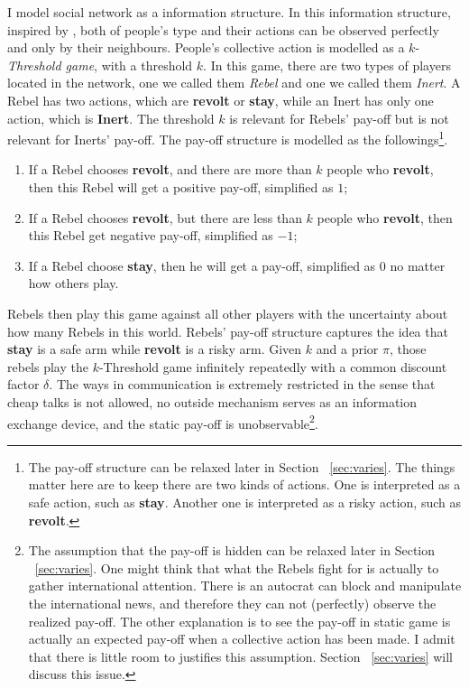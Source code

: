 \documentclass[12pt,letter]{article}
\theoremstyle{definition}
\theoremstyle{remark}
\theoremstyle{claim}
\begin{document}
I model social network as a information structure. In this information structure, inspired by \citep{chwe2000}, {both} of people's type and their actions can be observed {perfectly and only} by their neighbours. People's collective action is modelled as a $k$-\textit{Threshold game}, with a threshold $k$. In this game, there are two types of players located in the network, one we called them \textit{Rebel} and one we called them \textit{Inert}. A Rebel has two actions, which are \textbf{revolt} or \textbf{stay}, while an Inert has only one action, which is \textbf{Inert}. The threshold $k$ is relevant for Rebels' pay-off but is not relevant for Inerts' pay-off. The pay-off structure is modelled as the followings\footnote{The pay-off structure can be relaxed later in Section ~\ref{sec:varies}. The things matter here are to keep there are two kinds of actions. One is interpreted as a safe action, such as \textbf{stay}. Another one is interpreted as a risky action, such as \textbf{revolt}.}. 
\begin{enumerate}
\item If a Rebel chooses \textbf{revolt}, and there are more than $k$ people who \textbf{revolt}, then this Rebel will get a positive pay-off, simplified as $1$;
\item If a Rebel chooses \textbf{revolt}, but there are less than $k$ people who \textbf{revolt}, then this Rebel get negative pay-off, simplified  as $-1$;
\item If a Rebel choose \textbf{stay}, then he will get a pay-off, simplified as $0$ no matter how others play.
\end{enumerate}
Rebels then play this game against all other players with the uncertainty about how many Rebels in this world. Rebels' pay-off structure captures the idea that \textbf{stay} is a safe arm while \textbf{revolt} is a risky arm. Given $k$ and a prior $\pi$, those rebels play the $k$-Threshold game infinitely repeatedly with a common discount factor $\delta$. The ways in communication is extremely restricted in the sense that cheap talks is not allowed, no outside mechanism serves as an information exchange device, and the static pay-off is unobservable\footnote{The assumption that the pay-off is hidden can be relaxed later in Section ~\ref{sec:varies}. One might think that what the Rebels fight for is actually to gather international attention. There is an autocrat can block and manipulate the international news, and therefore they can not (perfectly) observe the realized pay-off. The other explanation is to see the pay-off in static game is actually an expected pay-off when a collective action has been made. I admit that there is little room to justifies this assumption. Section ~\ref{sec:varies} will discuss this issue.}.
\end{document}
